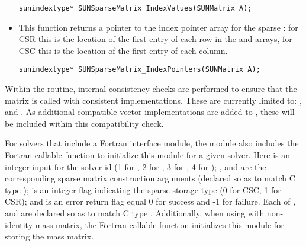 \begin{itemize}
  \verb|sunindextype* SUNSparseMatrix_IndexValues(SUNMatrix A);|


\item {}

  This function returns a pointer to the index pointer array for the
  sparse : for CSR this is the location of the first
  entry of each row in the  and  arrays, for
  CSC this is the location of the first entry of each column.
 
  \verb|sunindextype* SUNSparseMatrix_IndexPointers(SUNMatrix A);|

\end{itemize}
{\warn} Within the  routine, internal
consistency checks are performed to ensure that the matrix is called
with consistent {\nvector} implementations.  These are currently
limited to: {\nvecs}, {\nvecopenmp} and {\nvecpthreads}.  As
additional compatible vector implementations are added to {\sundials},
these will be included within this compatibility check. 


For solvers that include a Fortran interface module, the {\sunmatsparse}
module also includes the Fortran-callable
function  to
initialize this {\sunmatsparse} module for a given {\sundials} solver.
Here  is an integer input for the solver id (1 for {\cvode},
2 for {\ida}, 3 for {\kinsol}, 4 for {\arkode}); , 
and  are the corresponding sparse matrix construction
arguments (declared so as to match C type );  is an integer flag indicating the sparse
storage type (0 for CSC, 1 for CSR); and  is an error return
flag equal 0 for success and -1 for failure.  Each of ,
 and  are declared so as to match C
type . Additionally, when using {\arkode} with non-identity
mass matrix, the Fortran-callable
function  
initializes this {\sunmatsparse} module for storing the mass matrix.
